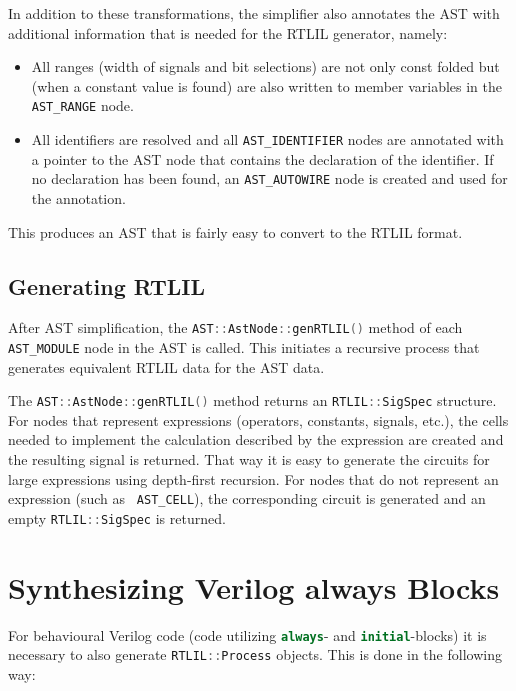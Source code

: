 In addition to these transformations, the simplifier also annotates the AST with additional information that is needed
for the RTLIL generator, namely:

\begin{itemize}
\item All ranges (width of signals and bit selections) are not only const folded but (when a constant value
is found) are also written to member variables in the {\tt AST\_RANGE} node.
\item All identifiers are resolved and all {\tt AST\_IDENTIFIER} nodes are annotated with a pointer to the AST node
that contains the declaration of the identifier. If no declaration has been found, an {\tt AST\_AUTOWIRE} node
is created and used for the annotation.
\end{itemize}

This produces an AST that is fairly easy to convert to the RTLIL format.

\subsection{Generating RTLIL}

After AST simplification, the \lstinline[language=C++]{AST::AstNode::genRTLIL()} method of each {\tt AST\_MODULE} node
in the AST is called. This initiates a recursive process that generates equivalent RTLIL data for the AST data.

The \lstinline[language=C++]{AST::AstNode::genRTLIL()} method returns an \lstinline[language=C++]{RTLIL::SigSpec} structure.
For nodes that represent expressions (operators, constants, signals, etc.), the cells needed to implement the calculation
described by the expression are created and the resulting signal is returned. That way it is easy to generate the circuits
for large expressions using depth-first recursion. For nodes that do not represent an expression (such as {\tt
AST\_CELL}), the corresponding circuit is generated and an empty \lstinline[language=C++]{RTLIL::SigSpec} is returned.

\section{Synthesizing Verilog always Blocks}

For behavioural Verilog code (code utilizing \lstinline[language=Verilog]{always}- and
\lstinline[language=Verilog]{initial}-blocks) it is necessary to also generate \lstinline[language=C++]{RTLIL::Process}
objects. This is done in the following way:

